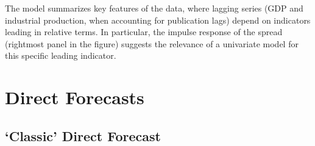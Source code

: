 \documentclass[a4paper]{article}
\begin{document}
The model summarizes key features of the data, where lagging series (GDP and industrial production, when accounting for publication lags) depend on  indicators leading in relative terms. In particular, the impulse response of the spread (rightmost panel in the figure) suggests the relevance of a univariate model for this specific leading indicator.


\section{Direct Forecasts}\label{direct_forecast}

\subsection{`Classic' Direct Forecast}\label{cdf}
\end{document}
